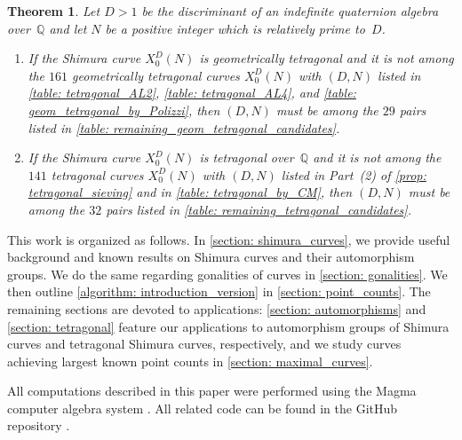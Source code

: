 \documentclass[11pt,reqno]{amsart}
\newcommand{\Q}{\mathbb{Q}}
\newtheorem{theorem}{Theorem}[section]
\theoremstyle{definition}
\begin{document}
\begin{theorem}\label{theorem: tetragonal_introduction}
Let $D>1$ be the discriminant of an indefinite quaternion algebra over~$\mathbb{Q}$ and let $N$ be a positive integer which is relatively prime to~$D$. 
\begin{enumerate}
    \item If the Shimura curve $X_0^D(N)$ is geometrically tetragonal and it is not among the $161$ geometrically tetragonal curves $X_0^D(N)$ with $(D,N)$ listed in \cref{table: tetragonal_AL2}, \cref{table: tetragonal_AL4}, and \cref{table: geom_tetragonal_by_Polizzi}, then $(D,N)$ must be among the $29$ pairs listed in \cref{table: remaining_geom_tetragonal_candidates}. 
    \item If the Shimura curve $X_0^D(N)$ is tetragonal over~$\Q$ and it is not among the $141$ tetragonal curves $X_0^D(N)$ with $(D,N)$ listed in Part~(2) of \cref{prop: tetragonal_sieving} and in \cref{table: tetragonal_by_CM}, then $(D,N)$ must be among the $32$ pairs listed in \cref{table: remaining_tetragonal_candidates}. 
\end{enumerate}
\end{theorem}


This work is organized as follows. In \cref{section: shimura_curves}, we provide useful background and known results on Shimura curves and their automorphism groups. We do the same regarding gonalities of curves in \cref{section: gonalities}. We then outline \cref{algorithm: introduction_version} in \cref{section: point_counts}. The remaining sections are devoted to applications: \cref{section: automorphisms} and \cref{section: tetragonal} feature our applications to automorphism groups of Shimura curves and tetragonal Shimura curves, respectively, and we study curves achieving largest known point counts in \cref{section: maximal_curves}.

All computations described in this paper were performed using the Magma computer algebra system \cite{Magma}. All related code can be found in the GitHub repository \cite{MPSSRep}.



\end{document}
